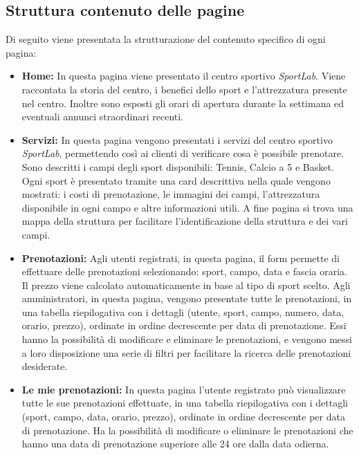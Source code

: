 \documentclass{article}
\begin{document}
\subsection{Struttura contenuto delle pagine}

Di seguito viene presentata la strutturazione del contenuto specifico di ogni pagina:

\begin{itemize}
    \item \textbf{Home:} In questa pagina viene presentato il centro sportivo \textit{SportLab}. Viene raccontata la storia del centro, i benefici dello sport e l'attrezzatura presente nel centro. Inoltre sono esposti gli orari di apertura durante la settimana ed eventuali annunci straordinari recenti.
    
    \item \textbf{Servizi:} In questa pagina vengono presentati i servizi del centro sportivo \textit{SportLab}, permettendo così ai clienti di verificare cosa è possibile prenotare. Sono descritti i campi degli sport disponibili: Tennis, Calcio a 5 e Basket. Ogni sport è presentato tramite una card descrittiva nella quale vengono mostrati: i costi di prenotazione, le immagini dei campi, l'attrezzatura disponibile in ogni campo e altre informazioni utili. A fine pagina si trova una mappa della struttura per facilitare l'identificazione della struttura e dei vari campi.
    
    \item \textbf{Prenotazioni:} Agli utenti registrati, in questa pagina, il form permette di effettuare delle prenotazioni selezionando: sport, campo, data e fascia oraria. Il prezzo viene calcolato automaticamente in base al tipo di sport scelto. Agli amministratori, in questa pagina, vengono presentate tutte le prenotazioni, in una tabella riepilogativa con i dettagli (utente, sport, campo, numero, data, orario, prezzo), ordinate in ordine decrescente per data di prenotazione. Essi hanno la possibilità di modificare e eliminare le prenotazioni, e vengono messi a loro disposizione una serie di filtri per facilitare la ricerca delle prenotazioni desiderate.
    
    \item \textbf{Le mie prenotazioni:} In questa pagina l'utente registrato può visualizzare tutte le sue prenotazioni effettuate, in una tabella riepilogativa con i dettagli (sport, campo, data, orario, prezzo), ordinate in ordine decrescente per data di prenotazione. Ha la possibilità di modificare o eliminare le prenotazioni che hanno una data di prenotazione superiore alle 24 ore dalla data odierna.


\end{itemize}
\end{document}
